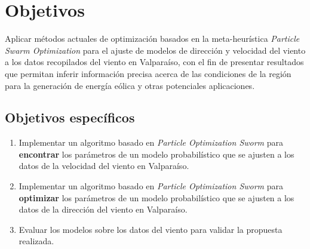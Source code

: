 \section{Objetivos}
Aplicar métodos actuales de optimización basados en la meta-heurística \emph{Particle Swarm Optimization} para el ajuste de modelos de dirección y velocidad del viento a los datos recopilados del viento en Valparaíso, con el fin de presentar resultados que permitan inferir información precisa acerca de las condiciones de la región para la generación de energía eólica y otras potenciales aplicaciones.

\subsection{Objetivos específicos}
\begin{enumerate}
    \item Implementar un algoritmo basado en \emph{Particle Optimization Sworm} para \textbf{encontrar} los parámetros de un modelo probabilístico que se ajusten a los datos de la velocidad del viento en Valparaíso. 
    \item Implementar un algoritmo basado en \emph{Particle Optimization Sworm} para \textbf{optimizar} los parámetros de un modelo probabilístico que se ajusten a los datos de la dirección del viento en Valparaíso.
    \item Evaluar los modelos sobre los datos del viento para validar la propuesta realizada.
\end{enumerate}

